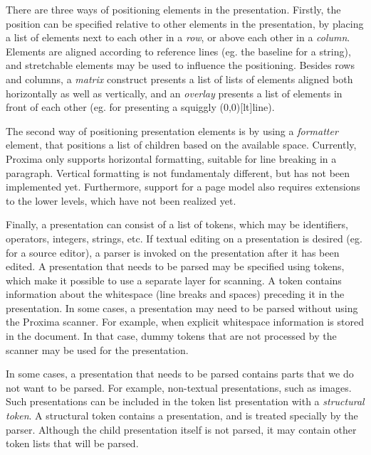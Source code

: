 There are three ways of positioning elements in the presentation. Firstly, the position can be specified relative to other elements in the presentation, by placing a list of elements next to each other in a {\em row}, or above each other in a {\em column}. Elements are aligned according to reference lines (eg. the baseline for a string), and stretchable elements may be used to influence the positioning. Besides rows and columns, a {\em matrix} construct presents a list of lists of elements aligned both horizontally as well as vertically, and an {\em overlay} presents a list of elements in front of each other (eg. for presenting a squiggly \makebox(0,0)[lt]{}line). 

The second way of positioning presentation elements is by using a {\em formatter} element, that positions a list of children based on the available space. Currently, Proxima only supports horizontal formatting, suitable for line breaking in a paragraph. Vertical formatting is not fundamentaly different, but has not been implemented yet. Furthermore, support for a page model also requires extensions to the lower levels, which have not been realized yet.

Finally, a presentation can consist of a list of tokens, which may be identifiers, operators, integers, strings, etc. If textual editing on a presentation is desired (eg. for a source editor), a parser is invoked on the presentation after it has been edited. A presentation that needs to be parsed may be specified using tokens, which make it possible to use a separate layer for scanning. A token contains information about the whitespace (line breaks and spaces) preceding it in the presentation. In some cases, a presentation may need to be parsed without using the Proxima scanner. For example, when explicit whitespace information is stored in the document. In that case, dummy tokens that are not processed by the scanner may be used for the presentation.

In some cases, a presentation that needs to be parsed contains parts that we do not want to be parsed. For example, non-textual presentations, such as images. Such presentations can be included in the token list presentation with a {\em structural token}. A structural token contains a presentation, and is treated specially by the parser. Although the child presentation itself is not parsed, it may contain other token lists that will be parsed.

